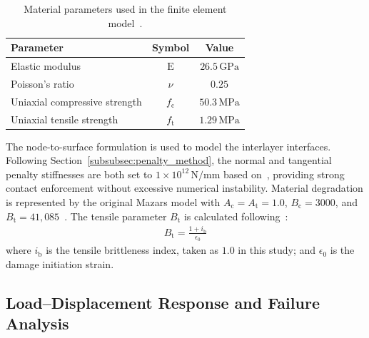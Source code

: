 \documentclass[review, authoryear, 12pt]{elsarticle}
\begin{document}
\begin{table}[t]
    \centering
    \footnotesize
    \caption{Material parameters used in the finite element model~\citep{telichko_finite_2024}.}
    \label{tab:material_parameters}
    \begin{tabular}{lcc}
        \toprule
        Parameter & Symbol & Value \\
        \midrule
        Elastic modulus & $ \text{E} $ & $ 26.5 \, \text{GPa} $ \\
        Poisson's ratio & $ \nu $ & $ 0.25 $ \\
        Uniaxial compressive strength & $ f_\text{c} $ & $ 50.3 \, \text{MPa} $ \\
        Uniaxial tensile strength & $ f_\text{t} $ & $ 1.29 \, \text{MPa} $ \\
        \bottomrule
    \end{tabular}
\end{table}

The node-to-surface formulation is used to model the interlayer interfaces. Following Section~\ref{subsubsec:penalty_method}, the normal and tangential penalty stiffnesses are both set to $1 \times 10^{12} \, \text{N/mm}$ based on~\citet{laursen_continuum-based_1993}, providing strong contact enforcement without excessive numerical instability. Material degradation is represented by the original Mazars model with $A_\text{c} = A_\text{t} = 1.0$, $B_\text{c} = 3000$, and $B_\text{t} = 41{,}085$~\citep{mazars_using_2006, mazars_new_2015, mazars_damage_2022}. The tensile parameter $B_\text{t}$ is calculated following~\citet{debuisne_need_2024}:
\begin{align}
    B_\text{t} = \frac{1 + i_{\text{b}}}{\epsilon_0} %
\end{align}
where $i_{\text{b}}$ is the tensile brittleness index, taken as $1.0$ in this study; and $\epsilon_0$ is the damage initiation strain.

\subsection{Load--Displacement Response and Failure Analysis}
\end{document}
